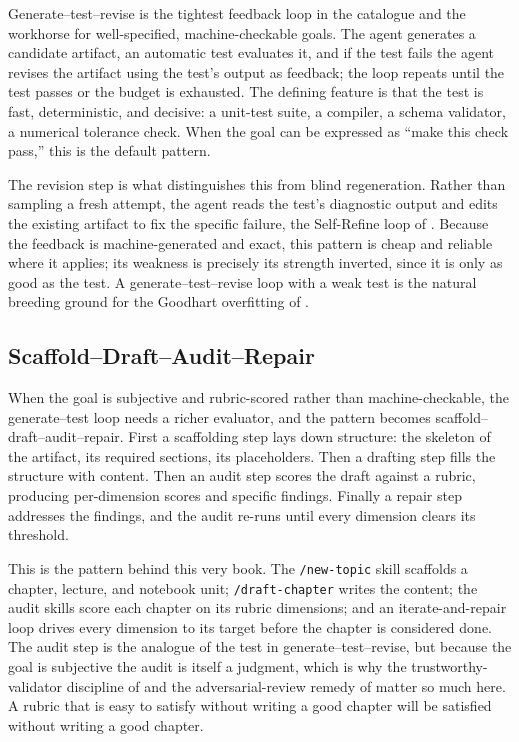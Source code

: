 Generate--test--revise is the tightest feedback loop in the catalogue and the
workhorse for well-specified, machine-checkable goals. The agent generates a
candidate artifact, an automatic test evaluates it, and if the test fails the
agent revises the artifact using the test's output as feedback; the loop repeats
until the test passes or the budget is exhausted. The defining feature is that
the test is fast, deterministic, and decisive: a unit-test suite, a compiler, a
schema validator, a numerical tolerance check. When the goal can be expressed as
``make this check pass,'' this is the default pattern.

The revision step is what distinguishes this from blind regeneration. Rather than
sampling a fresh attempt, the agent reads the test's diagnostic output and edits
the existing artifact to fix the specific failure, the Self-Refine loop of
 \citep{madaan2023selfrefine}. Because the feedback is
machine-generated and exact, this pattern is cheap and reliable where it applies;
its weakness is precisely its strength inverted, since it is only as good as the
test. A generate--test--revise loop with a weak test is the natural breeding
ground for the Goodhart overfitting of .

\subsection{Scaffold--Draft--Audit--Repair}\label{subsec:pattern-scaffold-draft-audit-repair}

When the goal is subjective and rubric-scored rather than machine-checkable, the
generate--test loop needs a richer evaluator, and the pattern becomes
scaffold--draft--audit--repair. First a scaffolding step lays down structure:
the skeleton of the artifact, its required sections, its placeholders. Then a
drafting step fills the structure with content. Then an audit step scores the
draft against a rubric, producing per-dimension scores and specific findings.
Finally a repair step addresses the findings, and the audit re-runs until every
dimension clears its threshold.

This is the pattern behind this very book. The \texttt{/new-topic} skill
scaffolds a chapter, lecture, and notebook unit; \texttt{/draft-chapter} writes
the content; the audit skills score each chapter on its rubric dimensions; and an
iterate-and-repair loop drives every dimension to its target before the chapter
is considered done. The audit step is the analogue of the test in
generate--test--revise, but because the goal is subjective the audit is itself a
judgment, which is why the trustworthy-validator discipline of
 and the adversarial-review remedy of
 matter so much here. A rubric that is easy to
satisfy without writing a good chapter will be satisfied without writing a good
chapter.


